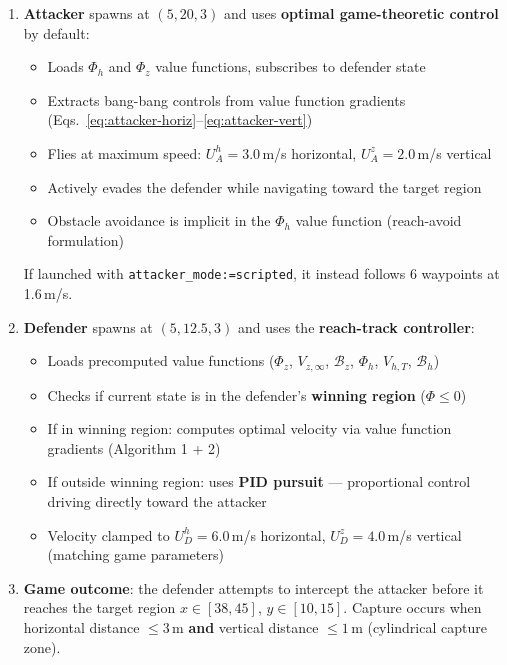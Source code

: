 \documentclass[11pt,a4paper]{article}
\begin{document}
\begin{enumerate}
    \item \textbf{Attacker} spawns at $(5, 20, 3)$ and uses \textbf{optimal game-theoretic control} by default:
    \begin{itemize}[noitemsep]
        \item Loads $\Phi_h$ and $\Phi_z$ value functions, subscribes to defender state
        \item Extracts bang-bang controls from value function gradients (Eqs.~\ref{eq:attacker-horiz}--\ref{eq:attacker-vert})
        \item Flies at maximum speed: $U_A^h = 3.0$\,m/s horizontal, $U_A^z = 2.0$\,m/s vertical
        \item Actively evades the defender while navigating toward the target region
        \item Obstacle avoidance is implicit in the $\Phi_h$ value function (reach-avoid formulation)
    \end{itemize}
    If launched with \texttt{attacker\_mode:=scripted}, it instead follows 6 waypoints at 1.6\,m/s.

    \item \textbf{Defender} spawns at $(5, 12.5, 3)$ and uses the \textbf{reach-track controller}:
    \begin{itemize}[noitemsep]
        \item Loads precomputed value functions ($\Phi_z$, $V_{z,\infty}$, $\mathcal{B}_z$, $\Phi_h$, $V_{h,T}$, $\mathcal{B}_h$)
        \item Checks if current state is in the defender's \textbf{winning region} ($\Phi \leq 0$)
        \item If in winning region: computes optimal velocity via value function gradients (Algorithm 1 + 2)
        \item If outside winning region: uses \textbf{PID pursuit} --- proportional control driving directly toward the attacker
        \item Velocity clamped to $U_D^h = 6.0$\,m/s horizontal, $U_D^z = 4.0$\,m/s vertical (matching game parameters)
    \end{itemize}

    \item \textbf{Game outcome}: the defender attempts to intercept the attacker before it reaches the target region $x \in [38,45]$, $y \in [10,15]$. Capture occurs when horizontal distance $\leq 3$\,m \textbf{and} vertical distance $\leq 1$\,m (cylindrical capture zone).
\end{enumerate}
\end{document}
